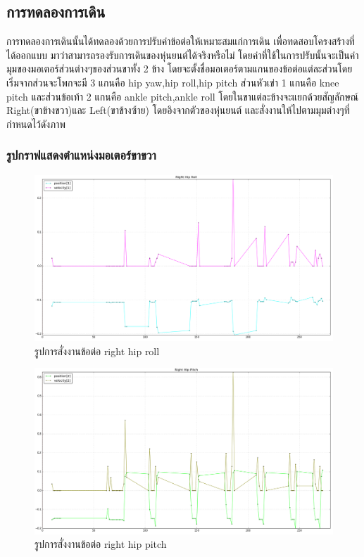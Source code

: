 \subsection{การทดลองการเดิน}
การทดลองการเดินนั้นได้ทดลองด้วยการปรับค่าข้อต่อให้เหมาะสมแก่การเดิน เพื่อทดสอบโครงสร้างที่ได้ออกแบบ
มาว่าสามารถรองรับการเดินของหุ่นยนต์ได้จริงหรือไม่ โดยค่าที่ใช้ในการปรับนั้นจะเป็นค่ามุมของมอเตอร์ส่วนต่างๆของส่วนขาทั้ง 2 ข้าง
โดยจะตั้งชื่อมอเตอร์ตามแกนของข้อต่อแต่ละส่วนโดยเริ่มจากส่วนจะโพกจะมี 3 แกนคือ hip yaw,hip roll,hip pitch ส่วนหัวเข่า 1 แกนคือ
knee pitch และส่วนข้อเท้า 2 แกนคือ ankle pitch,ankle roll โดยในขาแต่ละข้างจะแยกด้วยสัญลักษณ์ Right(ขาข้างขวา)และ Left(ขาข้างซ้าย)
โดยอิงจากตัวของหุ่นยนต์ และสั่งงานให้ไปตามมุมต่างๆที่กำหนดไว้ดังภาพ 

\subsubsection*{รูปกราฟแสดงตำแหน่งมอเตอร์ขาขวา}
\begin{figure}[!ht]
  \centering
  \includegraphics[width=1.0\linewidth]{chapter4/images/right_hip_roll.png}
  \caption{รูปการสั่งงานข้อต่อ right hip roll}
  \label{fig:right_hip_roll}
\end{figure}
\clearpage

\begin{figure}[!ht]
  \centering
  \includegraphics[width=1.0\linewidth]{chapter4/images/right_hip_pitch.png}
  \caption{รูปการสั่งงานข้อต่อ right hip pitch}
  \label{fig:right_hip_pitch}
\end{figure}

